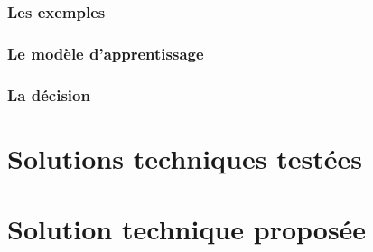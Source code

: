 \subsubsection{Les exemples}
\label{Automatisation du processus d'investigation: Achitecture High Level du système proposé: Les exemples}

\subsubsection{Le modèle d'apprentissage}
\label{Automatisation du processus d'investigation: Achitecture High Level du système proposé: Le modèle d'apprentissage}

\subsubsection{La décision}
\label{Automatisation du processus d'investigation: Achitecture High Level du système proposé: La décision}



\section{Solutions techniques testées}
\label{Automatisation du processus d'investigation: Solutions techniques testées}




\section{Solution technique proposée}
\label{Automatisation du processus d'investigation: Solution technique proposée}

